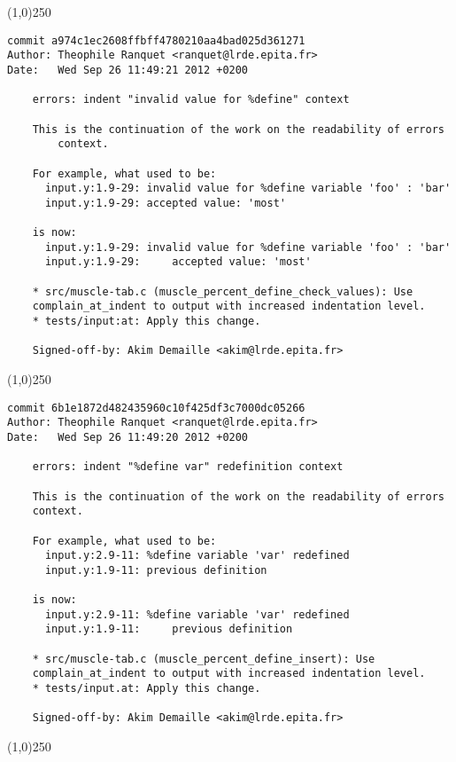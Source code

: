 \line(1,0){250}
\begin{verbatim}
commit a974c1ec2608ffbff4780210aa4bad025d361271
Author: Theophile Ranquet <ranquet@lrde.epita.fr>
Date:   Wed Sep 26 11:49:21 2012 +0200

    errors: indent "invalid value for %define" context
    
    This is the continuation of the work on the readability of errors
        context.
    
    For example, what used to be:
      input.y:1.9-29: invalid value for %define variable 'foo' : 'bar'
      input.y:1.9-29: accepted value: 'most'
    
    is now:
      input.y:1.9-29: invalid value for %define variable 'foo' : 'bar'
      input.y:1.9-29:     accepted value: 'most'
    
    * src/muscle-tab.c (muscle_percent_define_check_values): Use
    complain_at_indent to output with increased indentation level.
    * tests/input:at: Apply this change.
    
    Signed-off-by: Akim Demaille <akim@lrde.epita.fr>

\end{verbatim}
\line(1,0){250}
\begin{verbatim}
commit 6b1e1872d482435960c10f425df3c7000dc05266
Author: Theophile Ranquet <ranquet@lrde.epita.fr>
Date:   Wed Sep 26 11:49:20 2012 +0200

    errors: indent "%define var" redefinition context
    
    This is the continuation of the work on the readability of errors
    context.
    
    For example, what used to be:
      input.y:2.9-11: %define variable 'var' redefined
      input.y:1.9-11: previous definition
    
    is now:
      input.y:2.9-11: %define variable 'var' redefined
      input.y:1.9-11:     previous definition
    
    * src/muscle-tab.c (muscle_percent_define_insert): Use
    complain_at_indent to output with increased indentation level.
    * tests/input.at: Apply this change.
    
    Signed-off-by: Akim Demaille <akim@lrde.epita.fr>

\end{verbatim}
\line(1,0){250}

